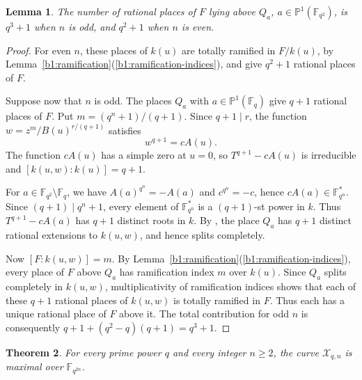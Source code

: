 \documentclass[12pt,reqno]{amsart}
\numberwithin{equation}{section}
\newcommand{\F}{\mathbb F}
\newcommand{\PP}{\mathbb P}
\theoremstyle{plain}
\newtheorem{theorem}{Theorem}[section]
\newtheorem{lemma}[theorem]{Lemma}
\theoremstyle{definition}
\theoremstyle{remark}
\begin{document}
\begin{lemma}
\label{b1:ramified-rational-places}
The number of rational places of \(F\) lying above \(Q_a\),
\(a\in\PP^1(\F_{q^2})\), is \(q^3+1\) when \(n\) is
odd, and \(q^2+1\) when \(n\) is even.
\end{lemma}

\begin{proof}
For even \(n\), these places of \(k(u)\) are totally ramified in
\(F/k(u)\), by Lemma~\ref{b1:ramification}(\ref{b1:ramification-indices}), and give \(q^2+1\)
rational places of \(F\).

Suppose now that \(n\) is odd. The places \(Q_a\) with
\(a\in\PP^1(\F_q)\) give \(q+1\) rational places of \(F\).
Put \(m=(q^n+1)/(q+1)\). Since \(q+1\mid r\), the function
\(w=z^m/B(u)^{r/(q+1)}\) satisfies
\begin{equation}
\label{b1:intermediate-equation}
 w^{q+1}=cA(u).
\end{equation}
The function \(cA(u)\) has a simple zero at \(u=0\), so
\(T^{q+1}-cA(u)\) is irreducible and
\([k(u,w):k(u)]=q+1\).

For \(a\in\F_{q^2}\setminus\F_q\), we have
\(A(a)^{q^n}=-A(a)\) and \(c^{q^n}=-c\), hence
\(cA(a)\in\F_{q^n}^*\).  Since \((q+1)\mid q^n+1\), every element of
\(\F_{q^n}^*\) is a \((q+1)\)-st power in \(k\). Thus
\(T^{q+1}-cA(a)\) has \(q+1\) distinct roots in \(k\).
By \cite[Corollary~3.3.8(c)]{Stichtenoth2009}, the place \(Q_a\)
has \(q+1\) distinct rational extensions to \(k(u,w)\), and hence
splits completely.

Now \([F:k(u,w)]=m\). By
Lemma~\ref{b1:ramification}(\ref{b1:ramification-indices}), every place of \(F\) above
\(Q_a\) has ramification index \(m\) over \(k(u)\).
Since \(Q_a\) splits completely in \(k(u,w)\), multiplicativity of
ramification indices shows that each of these \(q+1\) rational
places of \(k(u,w)\) is totally ramified in \(F\).
Thus each has a unique rational place of \(F\) above it.
The total contribution for odd \(n\) is consequently \(q+1+(q^2-q)(q+1)=q^3+1\).
\end{proof}

\begin{theorem}
\label{b1:maximality}
For every prime power \(q\) and every integer \(n\ge2\), the curve
\(\mathcal X_{q,n}\) is maximal over \(\F_{q^{2n}}\).
\end{theorem}
\end{document}
